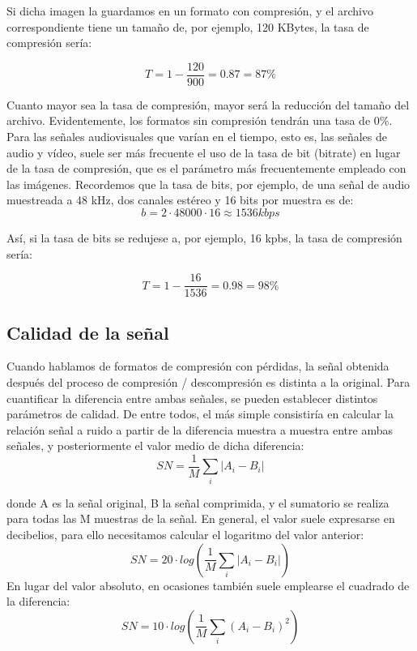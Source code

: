 \documentclass[es,practica]{uah}
\begin{document}
Si dicha imagen la guardamos en un formato con compresión, y el archivo correspondiente tiene un
tamaño de, por ejemplo, 120 KBytes, la tasa de compresión sería:

\begin{displaymath}
	T = 1 - \frac{120}{900} = 0.87 = 87\%
\end{displaymath}

Cuanto mayor sea la tasa de compresión, mayor será la reducción del tamaño del archivo. Evidentemente, los formatos sin compresión tendrán una tasa de 0\%.
Para las señales audiovisuales que varían en el tiempo, esto es, las señales de audio y vídeo, suele ser más frecuente el uso de la tasa de bit (bitrate) en lugar de la tasa de compresión, que es el parámetro más frecuentemente empleado con las imágenes. Recordemos que la tasa de bits, por ejemplo, de una señal de audio muestreada a 48 kHz, dos canales estéreo y 16 bits por muestra es de:
\begin{displaymath}
	b= 2 \cdot 48000 \cdot 16 \approx 1536 kbps
\end{displaymath}


Así, si la tasa de bits se redujese a, por ejemplo, 16 kpbs, la tasa de compresión sería:

\begin{displaymath}
	T = 1 - \frac{16}{1536} = 0.98 = 98 \%
\end{displaymath}

\subsection{Calidad de la señal}

Cuando hablamos de formatos de compresión con pérdidas, la señal obtenida después del proceso de compresión / descompresión es distinta a la original. Para cuantificar la diferencia entre ambas señales, se pueden establecer distintos parámetros de calidad. De entre todos, el más simple consistiría en calcular la relación señal a ruido a partir de la diferencia muestra a muestra entre ambas señales, y posteriormente el valor medio de dicha diferencia:
\begin{displaymath}
	SN = \frac{1}{M} \sum_i |A_i-B_i|
\end{displaymath}

donde A es la señal original, B la señal comprimida, y el sumatorio se realiza para todas las M muestras de la señal. En general, el valor suele expresarse en decibelios, para ello necesitamos calcular el logaritmo del valor anterior:
\begin{displaymath}
	SN = 20\cdot log \left ( \frac{1}{M} \sum_i |A_i-B_i| \right )
\end{displaymath}
En lugar del valor absoluto, en ocasiones también suele emplearse el cuadrado de la diferencia:
\begin{displaymath}
		SN = 10\cdot log \left ( \frac{1}{M} \sum_i (A_i-B_i)^2 \right )
\end{displaymath}
\end{document}
